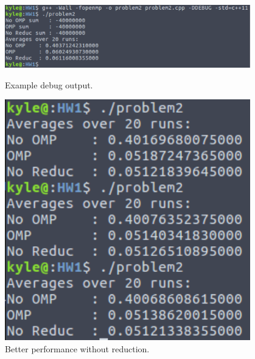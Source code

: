 \documentclass{article}
\begin{document}
\begin{figure}
    \centering
    \begin{minipage}{0.7\textwidth}
        \centering
        \includegraphics[width=0.95\textwidth]{Problem2debug} %
        \caption{Example debug output.}
        \label{fig:p2debug}
    \end{minipage}\hfill
    \begin{minipage}{0.3\textwidth}
        \centering
        \includegraphics[width=0.95\textwidth]{Problem2_60} %
        \caption{Better performance without reduction.}
        \label{fig:p2}
    \end{minipage}
\end{figure}



\end{document}
